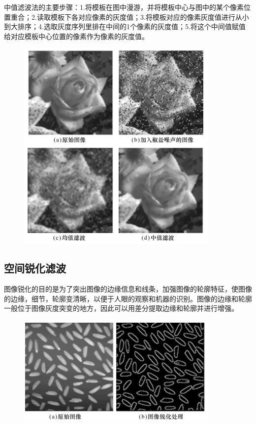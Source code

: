 \documentclass[11pt]{article}
\begin{document}
中值滤波法的主要步骤：1.将模板在图中漫游，并将模板中心与图中的某个像素位置重合；2.读取模板下各对应像素的灰度值；3.将模板对应的像素灰度值进行从小到大排序；4.选取灰度序列里排在中间的1个像素的灰度值；5.将这个中间值赋值给对应模板中心位置的像素作为像素的灰度值。

\begin{figure}[H]
	\centering
	\includegraphics[scale=0.5]{3}
\end{figure}

\subsection{空间锐化滤波}
图像锐化的目的是为了突出图像的边缘信息和线条，加强图像的轮廓特征，使图像的边缘，细节，轮廓变清晰，以便于人眼的观察和机器的识别。图像的边缘和轮廓一般位于图像灰度突变的地方，因此可以用差分提取边缘和轮廓并进行增强。

\begin{figure}[H]
	\centering
	\includegraphics[scale=0.5]{27}
\end{figure}
\end{document}
